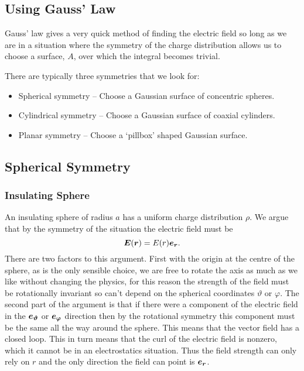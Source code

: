     \subsection{Using Gauss' Law}
    Gauss' law gives a very quick method of finding the electric field so long as we are in a situation where the symmetry of the charge distribution allows us to choose a surface, \(A\), over which the integral becomes trivial.
    
    There are typically three symmetries that we look for:
    \begin{itemize}
        \item Spherical symmetry -- Choose a Gaussian surface of concentric spheres.
        \item Cylindrical symmetry -- Choose a Gaussian surface of coaxial cylinders.
        \item Planar symmetry -- Choose a `pillbox' shaped Gaussian surface.
    \end{itemize}
    
    \subsection{Spherical Symmetry}
    \subsubsection{Insulating Sphere}
    An insulating sphere of radius \(a\) has a uniform charge distribution \(\rho\).
    We argue that by the symmetry of the situation the electric field must be
    \[\bm{E}(\bm{r}) = E(r)\bm{e_{r}}.\]
    There are two factors to this argument.
    First with the origin at the centre of the sphere, as is the only sensible choice, we are free to rotate the axis as much as we like without changing the physics, for this reason the strength of the field must be rotationally invariant so can't depend on the spherical coordinates \(\vartheta\) or \(\varphi\).
    The second part of the argument is that if there were a component of the electric field in the \(\bm{e_{\vartheta}}\) or \(\bm{e_{\varphi}}\) direction then by the rotational symmetry this component must be the same all the way around the sphere.
    This means that the vector field has a closed loop.
    This in turn means that the curl of the electric field is nonzero, which it cannot be in an electrostatics situation.
    Thus the field strength can only rely on \(r\) and the only direction the field can point is \(\bm{e_{r}}\).
    
